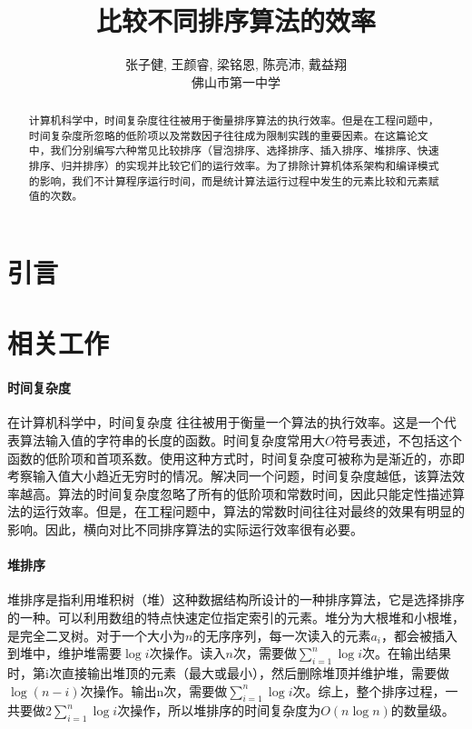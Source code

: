 \documentclass[UTF8]{ctexart}
\title{比较不同排序算法的效率}
\author{张子健, 王颜睿, 梁铭恩, 陈亮沛, 戴益翔 \\ 佛山市第一中学}
\begin{document}
\maketitle
\begin{abstract}
	计算机科学中，时间复杂度往往被用于衡量排序算法的执行效率。但是在工程问题中，时间复杂度所忽略的低阶项以及常数因子往往成为限制实践的重要因素。在这篇论文中，我们分别编写六种常见比较排序（冒泡排序、选择排序、插入排序、堆排序、快速排序、归并排序）的实现并比较它们的运行效率。为了排除计算机体系架构和编译模式的影响，我们不计算程序运行时间，而是统计算法运行过程中发生的元素比较和元素赋值的次数。
\end{abstract}

\section{引言}

\section{相关工作}

\paragraph{时间复杂度}
在计算机科学中，时间复杂度 \cite{cormen1990introduction} 往往被用于衡量一个算法的执行效率。这是一个代表算法输入值的字符串的长度的函数。时间复杂度常用大$O$符号表述，不包括这个函数的低阶项和首项系数。使用这种方式时，时间复杂度可被称为是渐近的，亦即考察输入值大小趋近无穷时的情况。解决同一个问题，时间复杂度越低，该算法效率越高。算法的时间复杂度忽略了所有的低阶项和常数时间，因此只能定性描述算法的运行效率。但是，在工程问题中，算法的常数时间往往对最终的效果有明显的影响。因此，横向对比不同排序算法的实际运行效率很有必要。

\paragraph{堆排序}
堆排序\cite{cormen1990introduction}是指利用堆积树（堆）这种数据结构所设计的一种排序算法，它是选择排序的一种。可以利用数组的特点快速定位指定索引的元素。堆分为大根堆和小根堆，是完全二叉树。对于一个大小为$n$的无序序列，每一次读入的元素$a_i$，都会被插入到堆中，维护堆需要$\log i$次操作。读入$n$次，需要做$\sum_{i=1}^{n}\log i$次。在输出结果时，第i次直接输出堆顶的元素（最大或最小），然后删除堆顶并维护堆，需要做$\log (n-i)$次操作。输出n次，需要做$\sum_{i=1}^{n}\log i$次。综上，整个排序过程，一共要做$2\sum_{i=1}^{n}\log i$次操作，所以堆排序的时间复杂度为$O(n \log n)$的数量级。
\end{document}
